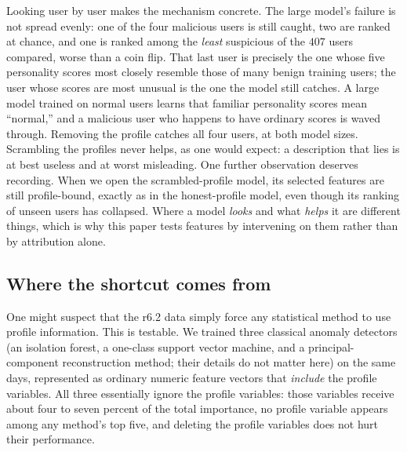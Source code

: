\documentclass[10pt]{article}
\begin{document}
Looking user by user makes the mechanism concrete. The large model's
failure is not spread evenly: one of the four malicious users is still
caught, two are ranked at chance, and one is ranked among the \emph{least}
suspicious of the $407$ users compared, worse than a coin flip. That last
user is precisely the one whose five personality scores most closely
resemble those of many benign training users; the user whose scores are
most unusual is the one the model still catches. A large model trained on
normal users learns that familiar personality scores mean ``normal,'' and
a malicious user who happens to have ordinary scores is waved through.
Removing the profile catches all four users, at both model sizes.
Scrambling the profiles never helps, as one would expect: a description
that lies is at best useless and at worst misleading. One further
observation deserves recording. When we open the scrambled-profile model,
its selected features are still profile-bound, exactly as in the
honest-profile model, even though its ranking of unseen users has
collapsed. Where a model \emph{looks} and what \emph{helps} it are
different things, which is why this paper tests features by intervening
on them rather than by attribution alone.

\subsection{Where the shortcut comes from}

One might suspect that the r6.2 data simply force any statistical method
to use profile information. This is testable. We trained three classical
anomaly detectors (an isolation forest, a one-class support vector
machine, and a principal-component reconstruction method; their details
do not matter here) on the same days, represented as ordinary numeric
feature vectors that \emph{include} the profile variables. All three
essentially ignore the profile variables: those variables receive about
four to seven percent of the total importance, no profile variable
appears among any method's top five, and deleting the profile variables
does not hurt their performance.
\end{document}
